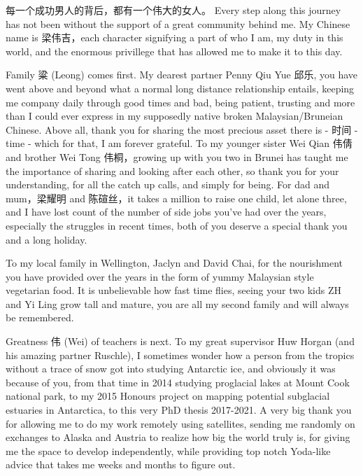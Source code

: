 \documentclass[12pt,twoside]{book}
\begin{document}
\begin{CJK*}{UTF8}{gbsn}
每一个成功男人的背后，都有一个伟大的女人。
Every step along this journey has not been without the support of a great community behind me.
My Chinese name is 梁伟吉，each character signifying a part of who I am, my duty in this world, and the enormous privillege that has allowed me to make it to this day.

Family 粱 (Leong) comes first.
My dearest partner Penny Qiu Yue 邱乐, you have went above and beyond what a normal long distance relationship entails, keeping me company daily through good times and bad, being patient, trusting and more than I could ever express in my supposedly native broken Malaysian/Bruneian Chinese.
Above all, thank you for sharing the most precious asset there is - 时间 - time - which for that, I am forever grateful.
To my younger sister Wei Qian 伟倩 and brother Wei Tong 伟桐，growing up with you two in Brunei has taught me the importance of sharing and looking after each other, so thank you for your understanding, for all the catch up calls, and simply for being.
For dad and mum，梁耀明 and 陈碹丝，it takes a million to raise one child, let alone three, and I have lost count of the number of side jobs you've had over the years, especially the struggles in recent times, both of you deserve a special thank you and a long holiday.

To my local family in Wellington, Jaclyn and David Chai, for the nourishment you have provided over the years in the form of yummy Malaysian style vegetarian food.
It is unbelievable how fast time flies, seeing your two kids ZH and Yi Ling grow tall and mature, you are all my second family and will always be remembered.

Greatness 伟 (Wei) of teachers is next.
To my great supervisor Huw Horgan (and his amazing partner Ruschle), I sometimes wonder how a person from the tropics without a trace of snow got into studying Antarctic ice, and obviously it was because of you, from that time in 2014 studying proglacial lakes at Mount Cook national park, to my 2015 Honours project on mapping potential subglacial estuaries in Antarctica, to this very PhD thesis 2017-2021.
A very big thank you for allowing me to do my work remotely using satellites, sending me randomly on exchanges to Alaska and Austria to realize how big the world truly is, for giving me the space to develop independently, while providing top notch Yoda-like advice that takes me weeks and months to figure out.


\end{CJK*}
\end{document}

